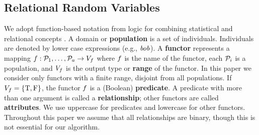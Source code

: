 \documentclass{acm_proc_article-sp}
\begin{document}

\subsection{Relational Random Variables} \label{sec:variables}
We adopt function-based notation from logic for combining statistical and relational concepts \cite{Russell2010}.
A domain or \textbf{population} is a set of individuals.
Individuals are denoted by lower case expressions (e.g., $\it{bob}$). 
A \textbf{functor} represents a mapping
$f: \mathcal{P}_{1},\ldots,\mathcal{P}_{a} \rightarrow V_{f}$
where $f$ is the name of the functor, each $\mathcal{P}_{i}$ is a population, and $V_{f}$ is the output type or \textbf{range} of the functor. 
In this paper we consider only functors with a finite range, disjoint from all populations.  If $V_{f} = \{\mathrm{T},\mathrm{F}\}$, the functor $f$ is a (Boolean) \textbf{predicate}. A predicate with more than one argument is called a \textbf{relationship}; other functors are called \textbf{attributes}. We use uppercase for predicates and lowercase for other functors. Throughout this paper we assume that all relationships are binary, though this is not essential for our algorithm.
\end{document}

